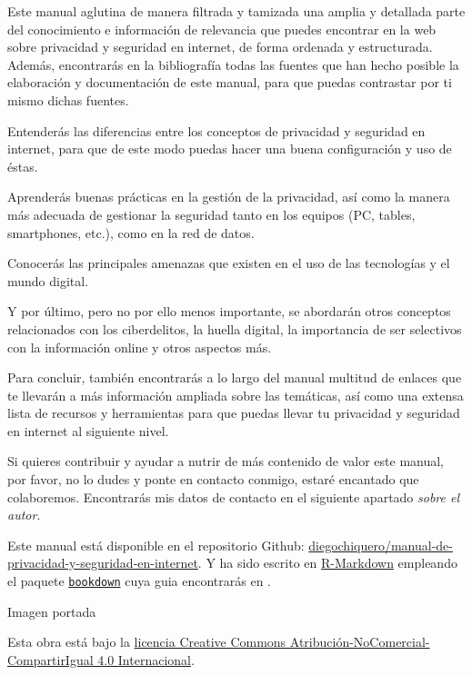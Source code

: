 \documentclass[
  spanish,
  a4paper,
  openany]{book}
\begin{document}
Este manual aglutina de manera filtrada y tamizada una amplia y detallada parte del conocimiento e información de relevancia que puedes encontrar en la web sobre privacidad y seguridad en internet, de forma ordenada y estructurada. Además, encontrarás en la bibliografía todas las fuentes que han hecho posible la elaboración y documentación de este manual, para que puedas contrastar por ti mismo dichas fuentes.

Entenderás las diferencias entre los conceptos de privacidad y seguridad en internet, para que de este modo puedas hacer una buena configuración y uso de éstas.

Aprenderás buenas prácticas en la gestión de la privacidad, así como la manera más adecuada de gestionar la seguridad tanto en los equipos (PC, tables, smartphones, etc.), como en la red de datos.

Conocerás las principales amenazas que existen en el uso de las tecnologías y el mundo digital.

Y por último, pero no por ello menos importante, se abordarán otros conceptos relacionados con los ciberdelitos, la huella digital, la importancia de ser selectivos con la información online y otros aspectos más.

Para concluir, también encontrarás a lo largo del manual multitud de enlaces que te llevarán a más información ampliada sobre las temáticas, así como una extensa lista de recursos y herramientas para que puedas llevar tu privacidad y seguridad en internet al siguiente nivel.

Si quieres contribuir y ayudar a nutrir de más contenido de valor este manual, por favor, no lo dudes y ponte en contacto conmigo, estaré encantado que colaboremos. Encontrarás mis datos de contacto en el siguiente apartado \emph{sobre el autor}.

Este manual está disponible en el repositorio Github: \href{https://github.com/diegochiquero/manual-de-privacidad-y-seguridad-en-internet}{diegochiquero/manual-de-privacidad-y-seguridad-en-internet}. Y ha sido escrito en \href{http://rmarkdown.rstudio.com}{R-Markdown} empleando el paquete \href{https://bookdown.org/}{\texttt{bookdown}} cuya guia encontrarás en \citep{R-bookdown}.

Imagen portada \citep{freepik}

Esta obra está bajo la \href{https://creativecommons.org/licenses/by-nc-sa/4.0/deed.es}{licencia Creative Commons Atribución-NoComercial-CompartirIgual 4.0 Internacional}.
\end{document}
